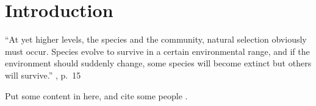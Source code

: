\chapter{Introduction}
\label{chap:introduction}

\begin{quoteshrink}
  ``At yet higher levels, the species and the community, natural
  selection obviously must occur. Species evolve to survive in a certain
  environmental range, and if the environment should suddenly change,
  some species will become extinct but others will survive.''
  \hfill\citet{Lewontin-1970-1}, p.~15
\end{quoteshrink}

\noindent
Put some content in here, and cite some people \citep{Allen-2003}.

